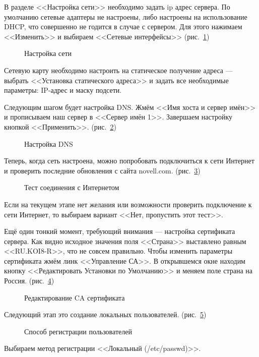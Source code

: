 В разделе <<Настройка сети>> необходимо задать ip адрес сервера. По умолчанию сетевые адаптеры не настроены, либо настроены на использование DHCP, что совершенно не годится в случае с сервером. Для этого нажимаем <<Изменить>> и выбираем <<Сетевые интерфейсы>> (рис.~\ref{fig8})
\begin{figure}[H]
\caption{Настройка сети}
\label{fig8}
\end{figure}
Сетевую карту необходимо настроить на статическое получение адреса — выбрать <<Установка статического адреса>> и задать все необходимые параметры: IP-адрес и маску подсети.
\clearpage

Следующим шагом будет настройка DNS. Жмём <<Имя хоста и сервер имён>> и прописываем наш сервер в <<Сервер имён 1>>. Завершаем настройку кнопкой <<Применить>>. (рис.~\ref{fig9})
\begin{figure}[H]
\caption{Настройка DNS}
\label{fig9}
\end{figure}
\clearpage

Теперь, когда сеть настроена, можно попробовать подключиться к сети Интернет и проверить последние обновления с сайта novell.com. (рис.~\ref{fig10})
\begin{figure}[H]
\caption{Тест соединения с Интернетом}
\label{fig10}
\end{figure}
Если на текущем этапе нет желания или возможности проверить подключение к сети Интернет, то выбираем вариант <<Нет, пропустить этот тест>>.
\clearpage

Ещё один тонкий момент, требующий внимания — настройка сертификата сервера. Как видно исходное значения поля <<Страна>> выставлено равным <<RU.KOI8-R>>, что не совсем правильно. Чтобы изменить параметры сертификата жмём линк <<Управление СА>>. В открывшемся окне находим кнопку <<Редактировать Установки по Умолчанию>> и меняем поле страна на Россия. (рис.~\ref{fig11})
\begin{figure}[H]
\caption{Редактирование CA сертификата}
\label{fig11}
\end{figure}
\clearpage

Следующий этап это создание локальных пользователей. (рис.~\ref{fig12})
\begin{figure}[H]
\caption{Способ регистрации пользователей}
\label{fig12}
\end{figure}
Выбираем метод регистрации <<Локальный (/etc/passwd)>>.
\clearpage

